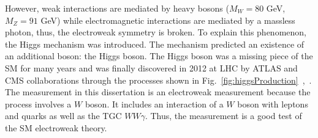 However, weak interactions are mediated by heavy bosons ($M_W=80$ GeV, $M_Z=91$ GeV) while electromagnetic interactions are mediated by a massless photon, thus, the electroweak symmetry is broken. To explain this phenomenon, the Higgs mechanism was introduced. The mechanism predicted an existence of an additional boson: the Higgs boson. The Higgs boson was a missing piece of the SM for many years and was finally discovered in 2012 at LHC by ATLAS and CMS collaborations through the processes shown in Fig.~\ref{fig:higgsProduction}~\cite{ref_HiggsPaperCMS},~\cite{ref_HiggsPaperATLAS}.\\

The measurement in this dissertation is an electroweak measurement because the process involves a $W$ boson. It includes an interaction of a $W$ boson with leptons and quarks as well as the TGC $WW\gamma$. Thus, the measurement is a good test of the SM electroweak theory.\\ 


